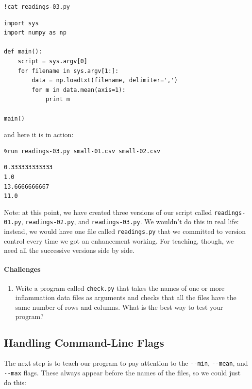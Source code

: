 \documentclass[]{book}
\begin{document}
\begin{verbatim}
!cat readings-03.py
\end{verbatim}

\begin{verbatim}
import sys
import numpy as np

def main():
    script = sys.argv[0]
    for filename in sys.argv[1:]:
        data = np.loadtxt(filename, delimiter=',')
        for m in data.mean(axis=1):
            print m

main()
\end{verbatim}

and here it is in action:

\begin{verbatim}
%run readings-03.py small-01.csv small-02.csv
\end{verbatim}

\begin{verbatim}
0.333333333333
1.0
13.6666666667
11.0
\end{verbatim}

Note: at this point, we have created three versions of our script called
\texttt{readings-01.py}, \texttt{readings-02.py}, and
\texttt{readings-03.py}. We wouldn't do this in real life: instead, we
would have one file called \texttt{readings.py} that we committed to
version control every time we got an enhancement working. For teaching,
though, we need all the successive versions side by side.

\mbox{}\paragraph{Challenges}

\begin{enumerate}
\item
  Write a program called \texttt{check.py} that takes the names of one
  or more inflammation data files as arguments and checks that all the
  files have the same number of rows and columns. What is the best way
  to test your program?
\end{enumerate}

\subsection{Handling Command-Line Flags}

The next step is to teach our program to pay attention to the
\texttt{-{}-min}, \texttt{-{}-mean}, and \texttt{-{}-max} flags. These
always appear before the names of the files, so we could just do this:
\end{document}
